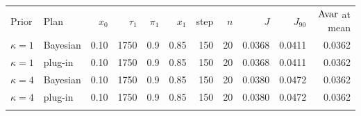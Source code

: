 \begin{tabular}{llrrrrrrrrr}
\toprule
Prior & Plan & $x_0$ & $\tau_1$ & $\pi_1$ & $x_1$ & step & $n$ & $J$ & $J_{90}$ & $\mathrm{Avar}$ at mean \\
$\kappa{=}1$ & Bayesian & 0.10 & 1750 & 0.9 & 0.85 & 150 & 20 & 0.0368 & 0.0411 & 0.0362 \\
$\kappa{=}1$ & plug-in & 0.10 & 1750 & 0.9 & 0.85 & 150 & 20 & 0.0368 & 0.0411 & 0.0362 \\
\addlinespace
$\kappa{=}4$ & Bayesian & 0.10 & 1750 & 0.9 & 0.85 & 150 & 20 & 0.0380 & 0.0472 & 0.0362 \\
$\kappa{=}4$ & plug-in & 0.10 & 1750 & 0.9 & 0.85 & 150 & 20 & 0.0380 & 0.0472 & 0.0362 \\
\addlinespace
\bottomrule
\end{tabular}
